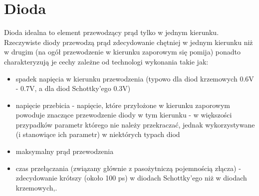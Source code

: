 % 
% 
% 
% 

\section{Dioda}

Dioda idealna to element przewodzący prąd tylko w jednym kierunku. Rzeczywiste diody przewodzą prąd zdecydowanie chętniej w jednym kierunku niż w drugim (na ogół przewodzenie w kierunku zaporowym się pomija) ponadto charakteryzują je cechy zależne od technologi wykonania takie jak:
\begin{itemize}
\item spadek napięcia w kierunku przewodzenia (typowo dla diod krzemowych 0.6V - 0.7V, a dla diod Schottky’ego 0.3V)
\item napięcie przebicia - napięcie, które przyłożone w kierunku zaporowym powoduje znaczące przewodzenie diody w tym kierunku - w większości przypadków parametr którego nie należy przekraczać, jednak wykorzystywane (i stanowiące ich parametr) w niektórych typach diod
\item maksymalny prąd przewodzenia
\item czas przełączania (związany głównie z pasożytniczą pojemnością złącza) - zdecydowanie krótszy (około 100 ps) w diodach Schottky’ego niż w diodach krzemowych,.
\end{itemize}

